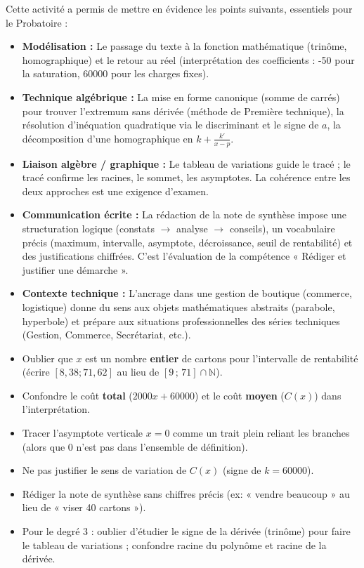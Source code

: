 \documentclass[11pt]{article}
\newcounter{popsec}
\newcounter{popsub}
\newcommand{\courssub}[1]{%
  \stepcounter{popsub}%
  \par\vspace{9pt}\noindent{\popxbold\fontsize{11.5}{13}\selectfont\color{popink}{\color{poporange}\thepopsec.\thepopsub}\hspace{6pt}#1}\par\nopagebreak\vspace{4pt}
}
\begin{document}
\courssub{Bilan de l'activité}
Cette activité a permis de mettre en évidence les points suivants, essentiels pour le Probatoire :
\begin{itemize}
    \item \textbf{Modélisation :} Le passage du texte à la fonction mathématique (trinôme, homographique) et le retour au réel (interprétation des coefficients : -50 pour la saturation, 60000 pour les charges fixes).
    \item \textbf{Technique algébrique :} La mise en forme canonique (somme de carrés) pour trouver l'extremum sans dérivée (méthode de Première technique), la résolution d'inéquation quadratique via le discriminant et le signe de $a$, la décomposition d'une homographique en $k + \frac{k'}{x-p}$.
    \item \textbf{Liaison algèbre / graphique :} Le tableau de variations guide le tracé ; le tracé confirme les racines, le sommet, les asymptotes. La cohérence entre les deux approches est une exigence d'examen.
    \item \textbf{Communication écrite :} La rédaction de la note de synthèse impose une structuration logique (constats $\to$ analyse $\to$ conseils), un vocabulaire précis (maximum, intervalle, asymptote, décroissance, seuil de rentabilité) et des justifications chiffrées. C'est l'évaluation de la compétence « Rédiger et justifier une démarche ».
    \item \textbf{Contexte technique :} L'ancrage dans une gestion de boutique (commerce, logistique) donne du sens aux objets mathématiques abstraits (parabole, hyperbole) et prépare aux situations professionnelles des séries techniques (Gestion, Commerce, Secrétariat, etc.).
\end{itemize}

\begin{attention}
\begin{itemize}
    \item Oublier que $x$ est un nombre \textbf{entier} de cartons pour l'intervalle de rentabilité (écrire $[8,38; 71,62]$ au lieu de $[9\,;\, 71] \cap \mathbb{N}$).
    \item Confondre le coût \textbf{total} ($2000x+60000$) et le coût \textbf{moyen} ($C(x)$) dans l'interprétation.
    \item Tracer l'asymptote verticale $x=0$ comme un trait plein reliant les branches (alors que $0$ n'est pas dans l'ensemble de définition).
    \item Ne pas justifier le sens de variation de $C(x)$ (signe de $k=60000$).
    \item Rédiger la note de synthèse sans chiffres précis (ex: « vendre beaucoup » au lieu de « viser 40 cartons »).
    \item Pour le degré 3 : oublier d'étudier le signe de la dérivée (trinôme) pour faire le tableau de variations ; confondre racine du polynôme et racine de la dérivée.
\end{itemize}
\end{attention}
\end{document}
